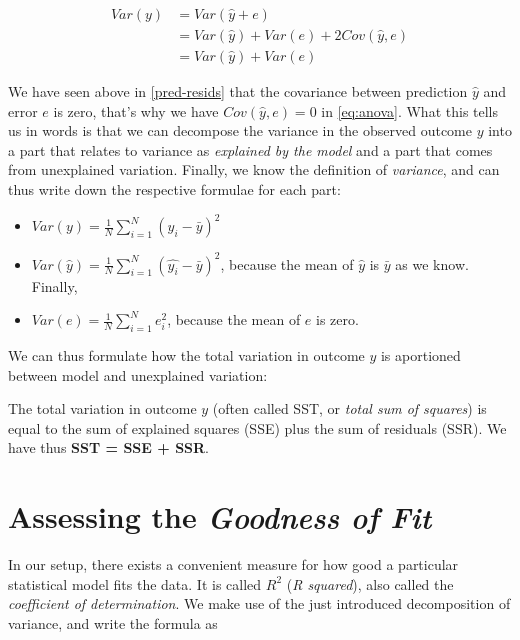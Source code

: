 \documentclass[]{book}
\providecommand{\tightlist}{%
  \setlength{\itemsep}{0pt}\setlength{\parskip}{0pt}}
\newenvironment{tip}{\begin{tcolorbox}[colback=green!5!white,colframe=green]}{\end{tcolorbox}}
\begin{document}
\begin{align}
Var(y) &= Var(\hat{y} + e)\\
 &= Var(\hat{y}) + Var(e) + 2 Cov(\hat{y},e)\\
 &= Var(\hat{y}) + Var(e) \label{eq:anova}
\end{align}

We have seen above in \ref{pred-resids} that the covariance between prediction \(\hat{y}\) and error \(e\) is zero, that's why we have \(Cov(\hat{y},e)=0\) in \eqref{eq:anova}.
What this tells us in words is that we can decompose the variance in the observed outcome \(y\) into a part that relates to variance as \emph{explained by the model} and a part that comes from unexplained variation. Finally, we know the definition of \emph{variance}, and can thus write down the respective formulae for each part:

\begin{itemize}
\tightlist
\item
  \(Var(y) = \frac{1}{N}\sum_{i=1}^N (y_i - \bar{y})^2\)
\item
  \(Var(\hat{y}) = \frac{1}{N}\sum_{i=1}^N (\hat{y_i} - \bar{y})^2\), because the mean of \(\hat{y}\) is \(\bar{y}\) as we know. Finally,
\item
  \(Var(e) = \frac{1}{N}\sum_{i=1}^N e_i^2\), because the mean of \(e\) is zero.
\end{itemize}

We can thus formulate how the total variation in outcome \(y\) is aportioned between model and unexplained variation:

\begin{tip}
The total variation in outcome \(y\) (often called SST, or \emph{total
sum of squares}) is equal to the sum of explained squares (SSE) plus the
sum of residuals (SSR). We have thus \textbf{SST = SSE + SSR}.
\end{tip}

\hypertarget{assessing-the-goodness-of-fit}{%
\section{\texorpdfstring{Assessing the \emph{Goodness of Fit}}{Assessing the Goodness of Fit}}\label{assessing-the-goodness-of-fit}}

In our setup, there exists a convenient measure for how good a particular statistical model fits the data. It is called \(R^2\) (\emph{R squared}), also called the \emph{coefficient of determination}. We make use of the just introduced decomposition of variance, and write the formula as
\end{document}
